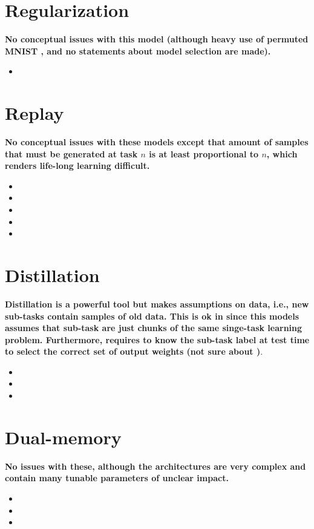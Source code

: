 \documentclass{article}
\begin{document}
\clearpage

\section{Regularization}
\textbf{No conceptual issues with this model (although heavy use of permuted MNIST , and no statements about model selection are made).}
\begin{itemize}
\item {}
\end{itemize}

\section{Replay}
\textbf{No conceptual issues with these models except that amount of samples that must be generated at task $n$ is at least proportional to $n$, which renders life-long learning difficult.}
\begin{itemize}
\item {}
\item {}
\item {}
\item {}
\item {}
\end{itemize}

\clearpage

\section{Distillation}
\textbf{Distillation is a powerful tool but makes assumptions on data, i.e., new sub-tasks contain samples of old data.
This is ok in \cite{kim2018keep} since this models assumes that sub-task are just chunks of the same singe-task learning problem.  Furthermore, \cite{li2018learning} requires to know the sub-task label at test time to select the correct set of output weights (not sure about \cite{kim2018keep})}.
\begin{itemize}
\item {}
\item {}
\item {}
\end{itemize}

\section{Dual-memory}
\textbf{No issues with these, although the architectures are very complex and contain many tunable parameters of unclear impact.}
\begin{itemize}
\item {}
\item {}
\item {}
\end{itemize}

\nocite{*}

\clearpage


\end{document}

